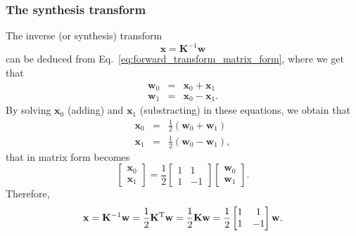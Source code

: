 \subsubsection{The synthesis transform}
The inverse (or synthesis) transform
\begin{equation}
  {\mathbf x} = {\mathbf K}^{-1}{\mathbf w}
  \label{eq:inverse_transform}
\end{equation}
can be deduced from Eq.~\eqref{eq:forward_transform_matrix_form}, where we
get that
\begin{equation}
  \begin{array}{rcl}
  {\mathbf w}_0 & = & {\mathbf x}_0 + {\mathbf x}_1\\
  {\mathbf w}_1 & = & {\mathbf x}_0 - {\mathbf x}_1.
  \end{array}
\end{equation}
By solving ${\mathbf x}_0$ (adding) and ${\mathbf x}_1$ (substracting) in
these equations, we obtain that
\begin{equation}
  \begin{array}{rcl}
  {\mathbf x}_0 & = & \frac{1}{2}({\mathbf w}_0 + {\mathbf w}_1)\\
  {\mathbf x}_1 & = & \frac{1}{2}({\mathbf w}_0 - {\mathbf w}_1),
  \end{array}
\end{equation}
that in matrix form becomes
\begin{equation}
  \begin{bmatrix}
    {\mathbf x}_0 \\
    {\mathbf x}_1
  \end{bmatrix}
  = \frac{1}{2}
  \begin{bmatrix} 1 & 1 \\ 1 & -1 \end{bmatrix}
  \begin{bmatrix}
    {\mathbf w}_0 \\
    {\mathbf w}_1
  \end{bmatrix}.
\end{equation}
Therefore,
\begin{equation}
  {\mathbf x} = {\mathbf K}^{-1}{\mathbf w} = \frac{1}{2}{\mathbf K}^{\text T}{\mathbf w} = \frac{1}{2}{\mathbf K}{\mathbf w} = \frac{1}{2}\begin{bmatrix} 1 & 1 \\ 1 & -1 \end{bmatrix}{\mathbf w}.
  \label{eq:inverse_transform_matrix_form}
\end{equation}

